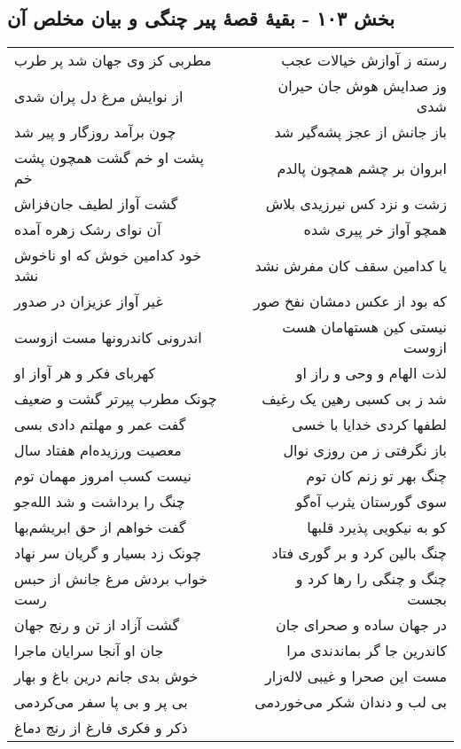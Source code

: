 \begin{center}
\section*{بخش ۱۰۳ - بقیهٔ قصهٔ پیر چنگی و بیان مخلص آن}
\label{sec:sh103}
\begin{longtable}{l p{0.5cm} r}
مطربی کز وی جهان شد پر طرب
&&
رسته ز آوازش خیالات عجب
\\
از نوایش مرغ دل پران شدی
&&
وز صدایش هوش جان حیران شدی
\\
چون برآمد روزگار و پیر شد
&&
باز جانش از عجز پشه‌گیر شد
\\
پشت او خم گشت همچون پشت خم
&&
ابروان بر چشم همچون پالدم
\\
گشت آواز لطیف جان‌فزاش
&&
زشت و نزد کس نیرزیدی بلاش
\\
آن نوای رشک زهره آمده
&&
همچو آواز خر پیری شده
\\
خود کدامین خوش که او ناخوش نشد
&&
یا کدامین سقف کان مفرش نشد
\\
غیر آواز عزیزان در صدور
&&
که بود از عکس دمشان نفخ صور
\\
اندرونی کاندرونها مست ازوست
&&
نیستی کین هستهامان هست ازوست
\\
کهربای فکر و هر آواز او
&&
لذت الهام و وحی و راز او
\\
چونک مطرب پیرتر گشت و ضعیف
&&
شد ز بی کسبی رهین یک رغیف
\\
گفت عمر و مهلتم دادی بسی
&&
لطفها کردی خدایا با خسی
\\
معصیت ورزیده‌ام هفتاد سال
&&
باز نگرفتی ز من روزی نوال
\\
نیست کسب امروز مهمان توم
&&
چنگ بهر تو زنم کان توم
\\
چنگ را برداشت و شد الله‌جو
&&
سوی گورستان یثرب آه‌گو
\\
گفت خواهم از حق ابریشم‌بها
&&
کو به نیکویی پذیرد قلبها
\\
چونک زد بسیار و گریان سر نهاد
&&
چنگ بالین کرد و بر گوری فتاد
\\
خواب بردش مرغ جانش از حبس رست
&&
چنگ و چنگی را رها کرد و بجست
\\
گشت آزاد از تن و رنج جهان
&&
در جهان ساده و صحرای جان
\\
جان او آنجا سرایان ماجرا
&&
کاندرین جا گر بماندندی مرا
\\
خوش بدی جانم درین باغ و بهار
&&
مست این صحرا و غیبی لاله‌زار
\\
بی پر و بی پا سفر می‌کردمی
&&
بی لب و دندان شکر می‌خوردمی
\\
ذکر و فکری فارغ از رنج دماغ

\end{longtable}
\end{center}
